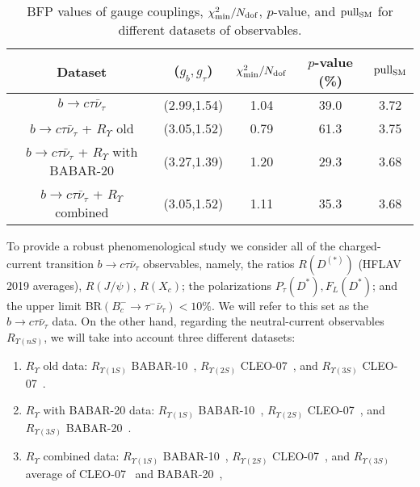 \documentclass[reprint,showpacs,aps,prd,nofootinbib,superscriptaddress,longbibliography]{revtex4-1}
\begin{document}
\begin{table*}[!t]
\centering
\renewcommand{\arraystretch}{1.2}
\renewcommand{\arrayrulewidth}{0.8pt}
\begin{tabular}{ccccc}
\hline \hline                                                                                                                           
Dataset & ($g_b,g_\tau$) & $\chi^2_{\rm min}/N_{\rm dof}$ & $p$-value (\%) & $\rm{pull_{SM}}$ \\                                                                                                                             
\hline
$b \to c \tau \bar{\nu}_\tau$ & (2.99,1.54) & 1.04 & 39.0 & 3.72  \\
$b \to c \tau \bar{\nu}_\tau$ + $R_\Upsilon$ old & (3.05,1.52) & 0.79 & 61.3 & 3.75  \\
$b \to c \tau \bar{\nu}_\tau$ + $R_\Upsilon$ with BABAR-20 & (3.27,1.39) & 1.20 & 29.3 & 3.68  \\
$b \to c \tau \bar{\nu}_\tau$ + $R_\Upsilon$ combined & (3.05,1.52) & 1.11 & 35.3 & 3.68  \\
\hline\hline
\end{tabular}
\caption{BFP values of gauge couplings, $\chi^2_{\rm min}/N_{\rm dof}$, $p$-value, and $\rm{pull_{SM}}$ for different datasets of observables.} \label{fit}
\end{table*} 

To provide a robust phenomenological study we consider all of the charged-current transition $b \to c \tau \bar{\nu}_\tau$ observables, namely, the ratios $R(D^{(\ast)})$ (HFLAV 2019 averages), $R(J/\psi)$, $R(X_c)$; the polarizations $P_\tau(D^\ast), F_L(D^\ast)$; and the upper limit BR$(B_c^{-} \to \tau^{-} \bar{\nu}_\tau) < 10 \%$. We will refer to this set as the  $b \to c \tau \bar{\nu}_\tau$ data. On the other hand, regarding the neutral-current observables $R_{\Upsilon(nS)}$, we will take into account three different datasets:
\begin{enumerate}
\item $R_{\Upsilon}$ old data: $R_{\Upsilon(1S)}$ BABAR-10~\cite{delAmoSanchez:2010bt}, $R_{\Upsilon(2S)}$ CLEO-07~\cite{Besson:2006gj}, and $R_{\Upsilon(3S)}$ CLEO-07~\cite{Besson:2006gj}.
\item $R_{\Upsilon}$ with BABAR-20 data: $R_{\Upsilon(1S)}$ BABAR-10~\cite{delAmoSanchez:2010bt}, $R_{\Upsilon(2S)}$ CLEO-07~\cite{Besson:2006gj}, and $R_{\Upsilon(3S)}$ BABAR-20~\cite{Lees:2020kom}.
\item $R_{\Upsilon}$ combined data: $R_{\Upsilon(1S)}$ BABAR-10~\cite{delAmoSanchez:2010bt}, $R_{\Upsilon(2S)}$ CLEO-07~\cite{Besson:2006gj}, and $R_{\Upsilon(3S)}$ average of CLEO-07~\cite{Besson:2006gj} and BABAR-20~\cite{Lees:2020kom},
\end{enumerate}
\end{document}
